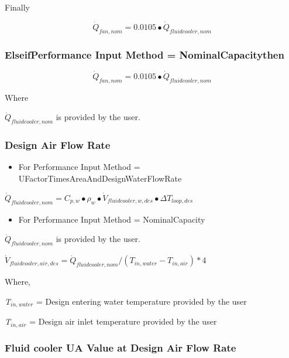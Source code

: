 Finally

\begin{equation}
{\dot Q_{fan,nom}} = 0.0105 \bullet {\dot Q_{fluidcooler,nom}}
\end{equation}

\subsubsection{ElseifPerformance Input Method = NominalCapacitythen}\label{elseifperformance-input-method-nominalcapacitythen}

\begin{equation}
  {\dot Q_{fan,nom}} = 0.0105 \bullet {\dot Q_{fluidcooler,nom}}
\end{equation}

Where

\({\dot Q_{fluidcooler,nom}}\) is provided by the user.

\subsubsection{Design Air Flow Rate}\label{design-air-flow-rate-1}

\begin{itemize}
\tightlist
\item
  For Performance Input Method = UFactorTimesAreaAndDesignWaterFlowRate
\end{itemize}

\({\dot Q_{fluidcooler,nom}} = {C_{p,w}} \bullet {\rho_w} \bullet {\dot V_{fluidcooler,w,des}} \bullet \Delta {T_{loop,des}}\)

\begin{itemize}
\tightlist
\item
  For Performance Input Method = NominalCapacity
\end{itemize}

\({\dot Q_{fluidcooler,nom}}\) is provided by the user.

\({\dot V_{fluidcooler,air,des}} = {\dot Q_{fluidcooler,nom}}/({T_{in,water}} - {T_{in,air}})*4\)

Where,

\emph{T\(_{in,water}\)} = Design entering water temperature provided by the user

\emph{T\(_{in,air}\)} = Design air inlet temperature provided by the user

\subsubsection{Fluid cooler UA Value at Design Air Flow Rate}\label{fluid-cooler-ua-value-at-design-air-flow-rate}

